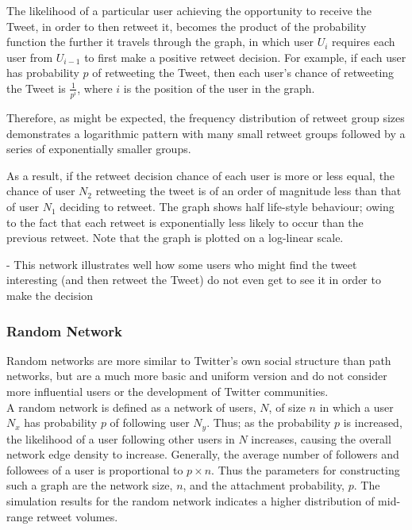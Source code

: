 The likelihood of a particular user achieving the opportunity to receive the Tweet, in order to then retweet it, becomes the product of the probability function the further it travels through the graph, in which user $U_i$ requires each user from $U_{i-1}$ to first make a positive retweet decision. For example, if each user has probability $p$ of retweeting the Tweet, then each user's chance of retweeting the Tweet is $\frac{1}{p^i}$, where $i$ is the position of the user in the graph.

Therefore, as might be expected, the frequency distribution of retweet group sizes demonstrates a logarithmic pattern with many small retweet groups followed by a series of exponentially smaller groups.



As a result, if the retweet decision chance of each user is more or less equal, the chance of user $ N_2  $ retweeting the tweet is of an order of magnitude less than that of user $ N_1 $ deciding to retweet. The graph shows half life-style behaviour; owing to the fact that each retweet is exponentially less likely to occur than the previous retweet. Note that the graph is plotted on a log-linear scale.

- This network illustrates well how some users who might find the tweet interesting (and then retweet the Tweet) do not even get to see it in order to make the decision

\subsubsection{Random Network}
Random networks are more similar to Twitter's own social structure than path networks, but are a much more basic and uniform version and do not consider more influential users or the development of Twitter communities.
\\
A random network is defined as a network of users, $ N $, of size $ n $ in which a user $ N_x $ has probability $ p $ of following user $ N_y $. Thus; as the probability $ p $ is increased, the likelihood of a user following other users in $ N $ increases, causing the overall network edge density to increase. Generally, the average number of followers and followees of a user is proportional to $ p\times n $. Thus the parameters for constructing such a graph are the network size, $n$, and the attachment probability, $p$. The simulation results for the random network indicates a higher distribution of mid-range retweet volumes.
\begin{figure}[h]
\end{figure}

